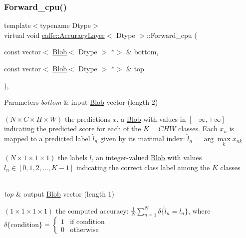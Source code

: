 \subsubsection{\texorpdfstring{Forward\+\_\+cpu()}{Forward\_cpu()}\hspace{0.1cm}{\footnotesize\ttfamily [1/2]}}
{\footnotesize\ttfamily template$<$typename Dtype$>$ \\
virtual void \mbox{\hyperlink{classcaffe_1_1_accuracy_layer}{caffe\+::\+Accuracy\+Layer}}$<$ Dtype $>$\+::Forward\+\_\+cpu (\begin{DoxyParamCaption}\item[{const vector$<$ \mbox{\hyperlink{classcaffe_1_1_blob}{Blob}}$<$ Dtype $>$ $\ast$$>$ \&}]{bottom,  }\item[{const vector$<$ \mbox{\hyperlink{classcaffe_1_1_blob}{Blob}}$<$ Dtype $>$ $\ast$$>$ \&}]{top }\end{DoxyParamCaption})\hspace{0.3cm}{\ttfamily [protected]}, {\ttfamily [virtual]}}


\begin{DoxyParams}{Parameters}
{\em bottom} & input \mbox{\hyperlink{classcaffe_1_1_blob}{Blob}} vector (length 2)
\begin{DoxyEnumerate}
\item $ (N \times C \times H \times W) $ the predictions $ x $, a \mbox{\hyperlink{classcaffe_1_1_blob}{Blob}} with values in $ [-\infty, +\infty] $ indicating the predicted score for each of the $ K = CHW $ classes. Each $ x_n $ is mapped to a predicted label $ \hat{l}_n $ given by its maximal index\+: $ \hat{l}_n = \arg\max\limits_k x_{nk} $
\item $ (N \times 1 \times 1 \times 1) $ the labels $ l $, an integer-\/valued \mbox{\hyperlink{classcaffe_1_1_blob}{Blob}} with values $ l_n \in [0, 1, 2, ..., K - 1] $ indicating the correct class label among the $ K $ classes 
\end{DoxyEnumerate}\\
\hline
{\em top} & output \mbox{\hyperlink{classcaffe_1_1_blob}{Blob}} vector (length 1)
\begin{DoxyEnumerate}
\item $ (1 \times 1 \times 1 \times 1) $ the computed accuracy\+: $ \frac{1}{N} \sum\limits_{n=1}^N \delta\{ \hat{l}_n = l_n \} $, where $ \delta\{\mathrm{condition}\} = \left\{ \begin{array}{lr} 1 & \mbox{if condition} \\ 0 & \mbox{otherwise} \end{array} \right. $ 
\end{DoxyEnumerate}\\
\hline
\end{DoxyParams}


